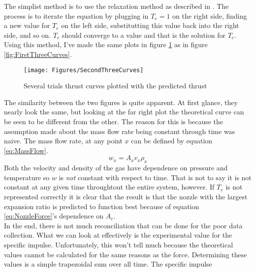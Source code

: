 The simplist method is to use the relaxation method as described in \cite{newman}. The process is to iterate the equation by plugging in $T_e=1$ on the right side, finding a new value for $T_e$ on the left side, substitutting this value back into the right side, and so on. $T_e$ should converge to a value and that is the solution for $T_e$. Using this method, I've made the same plots in figure \ref{fig:SecondThreeCurves} as in figure \ref{fig:FirstThreeCurves}.
\begin{figure}[h!]
\centering
\texttt{[image: Figures/SecondThreeCurves]}
\caption{Several trials thrust curves plotted with the predicted thrust}
\label{fig:SecondThreeCurves}
\end{figure}
The similarity between the two figures is quite apparent. At first glance, they nearly look the same, but looking at the far right plot the theoretical curve can be seen to be different from the other. The reason for this is because the assumption made about the mass flow rate being constant through time was naive. The mass flow rate, at any point $x$  can be defined by equation \ref{eq:MassFlow}.
\begin{equation}\label{eq:MassFlow}
w_x=A_x v_x \rho_x
\end{equation}%
%
Both the velocity and density of the gas have dependence on pressure and temperature so $w$ is \textit{not} constant with respect to time. That is not to say it is not constant at any given time throughtout the entire system, however. If $T_e$ is not represented correctly it is clear that the result is that the nozzle with the largest expansion ratio is predicted to function best because of equation \ref{eq:NozzleForce}'s dependence on $A_e$. \\
In the end, there is not much reconciliation that can be done for the poor data collection. What we can look at effectively is the experimental value for the specific impulse. Unfortunately, this won't tell much because the theoretical values cannot be calculated for the same reasons as the force. Determining these values is a simple trapezoidal sum over all time. The specific impulse
